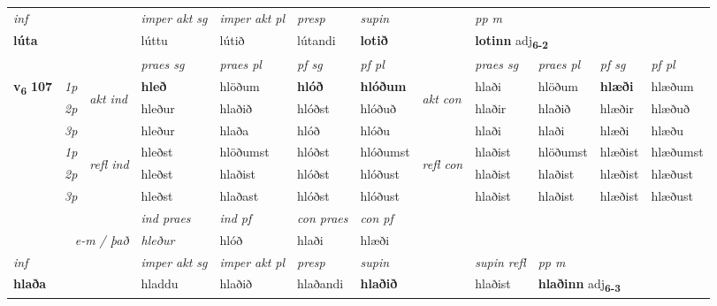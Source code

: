 \begin{longtable}[l]{X>{\footnotesize\itshape}llXXXXlXXXX}
   {\textit{inf}} & &  & \textit{imper akt sg} & \textit{imper akt pl}   & \textit{presp} & \textit{supin}  && \textit{pp m} \\*
  {\textbf{lúta}} & && lúttu  & lútið   & lútandi &  \textbf{lotið}  && \multicolumn{2}{l}{\textbf{lotinn} adj\textbf{\textsubscript{6-2}}} \\*

\midrule

 & &   & \textit{praes sg}  & \textit{praes pl}    & \textit{ pf sg} & \textit{pf pl} & & \textit{praes sg}  & \textit{praes pl}    & \textit{pf sg} & \textit{pf pl }  \\ \cmidrule{4-7} \cmidrule{9-12}
 \multirow{2}{*}{{{\textbf{v{\textsubscript{6}}} \Large{\textbf{107}}}}}  & 1p & \multirow{3}{*}{\begin{turn}{90}\textit{akt ind}\end{turn}} & \textbf{hleð} & hlöðum & \textbf{hlóð} & \textbf{hlóðum} & \multirow{3}{*}{\begin{turn}{90}\textit{akt con}\end{turn}} &hlaði & hlöðum & \textbf{hlæði} & hlæðum\\*
 & 2p &  &  hleður  & hlaðið & hlóðst & hlóðuð & & hlaðir & hlaðið & hlæðir & hlæðuð \\*
 & 3p &  & hleður & hlaða & hlóð & hlóðu & & hlaði & hlaði& hlæði & hlæðu \\*
\cmidrule{4-7} \cmidrule{9-12}
 & 1p & \multirow{3}{*}{\begin{turn}{90}\textit{refl ind}\end{turn}}  & hleðst & hlöðumst & hlóðst & hlóðumst & \multirow{3}{*}{\begin{turn}{90}\textit{refl con}\end{turn}}  &hlaðist & hlöðumst & hlæðist & hlæðumst \\*
 & 2p &  & hleðst & hlaðist & hlóðst & hlóðust & &hlaðist & hlaðist & hlæðist & hlæðust \\*
 & 3p  & & hleðst & hlaðast & hlóðst & hlóðust & & hlaðist & hlaðist& hlæðist & hlæðust \\*
\cmidrule{4-7} \cmidrule{9-12}

   && &  \textit{ind praes} & \textit{ind pf} & \textit{con praes} & \textit{con pf} \\*
\multicolumn{3}{r}{\textit{e-m / það}} & hleður & hlóð & hlaði & hlæði \\*

\cmidrule{4-7}
   {\textit{inf}} & &  & \textit{imper akt sg} & \textit{imper akt pl}   & \textit{presp} & \textit{supin} && \textit{supin refl} & \textit{pp m} \\*
  {\textbf{hlaða}} & && hladdu  & hlaðið   & hlaðandi &  \textbf{hlaðið} && hlaðist & \multicolumn{2}{l}{\textbf{hlaðinn} adj\textbf{\textsubscript{6-3}}} \\*


\end{longtable}
